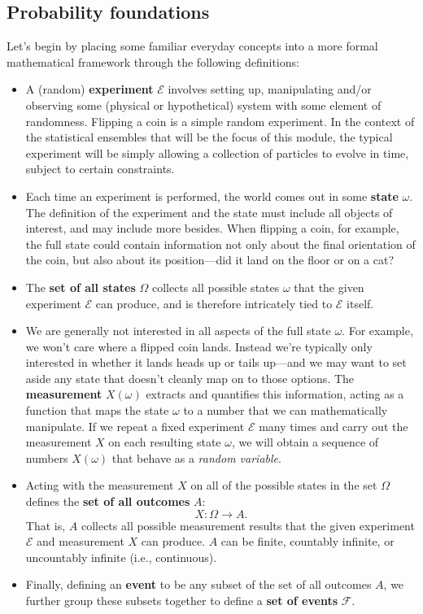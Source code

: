 \documentclass[12 pt]{article}
\newcommand{\cE}{\ensuremath{\mathcal E} }
\newcommand{\cF}{\ensuremath{\mathcal F} }
\newcommand{\om}{\ensuremath{\omega} }
\newcommand{\Om}{\ensuremath{\Omega} }
\begin{document}
\subsection{Probability foundations}
Let's begin by placing some familiar everyday concepts into a more formal mathematical framework through the following definitions: \\[-24 pt]
\begin{itemize}
  \item A (random) \textbf{experiment} \cE involves setting up, manipulating and/or observing some (physical or hypothetical) system with some element of randomness.
        Flipping a coin is a simple random experiment.
        In the context of the statistical ensembles that will be the focus of this module, the typical experiment will be simply allowing a collection of particles to evolve in time, subject to certain constraints.
  \item Each time an experiment is performed, the world comes out in some \textbf{state} $\om$.
        The definition of the experiment and the state must include all objects of interest, and may include more besides.
        When flipping a coin, for example, the full state could contain information not only about the final orientation of the coin, but also about its position---did it land on the floor or on a cat?
  \item The \textbf{set of all states} \Om collects all possible states \om that the given experiment \cE can produce, and is therefore intricately tied to \cE itself.
  \item We are generally not interested in all aspects of the full state $\om$.
        For example, we won't care where a flipped coin lands.
        Instead we're typically only interested in whether it lands heads up or tails up---and we may want to set aside any state that doesn't cleanly map on to those options.
        The \textbf{measurement} $X(\om)$ extracts and quantifies this information, acting as a function that maps the state \om to a number that we can mathematically manipulate.
        If we repeat a fixed experiment \cE many times and carry out the measurement $X$ on each resulting state $\om$, we will obtain a sequence of numbers $X(\om)$ that behave as a \textit{random variable}.
  \item Acting with the measurement $X$ on all of the possible states in the set $\Om$ defines the \textbf{set of all outcomes} $A$:
        \begin{equation*}
          X: \Om \to A.
        \end{equation*}
        That is, $A$ collects all possible measurement results that the given experiment \cE and measurement $X$ can produce.
        $A$ can be finite, countably infinite, or uncountably infinite (i.e., continuous).
  \item Finally, defining an \textbf{event} to be any subset of the set of all outcomes $A$, we further group these subsets together to define a \textbf{set of events} $\cF$.
\end{itemize}
\end{document}
